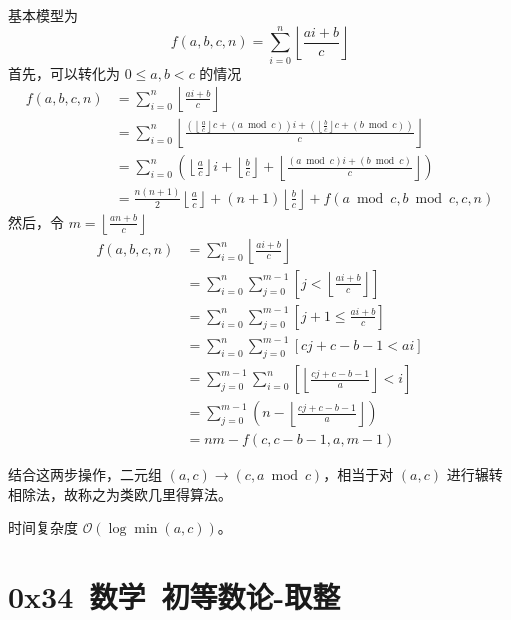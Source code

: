 基本模型为
\[
f(a, b, c, n) = \sum_{i = 0}^n \left\lfloor \frac{ai + b}{c} \right\rfloor
\]
首先，可以转化为 $0 \leq a, b < c$ 的情况
\[
\begin{aligned}
f(a, b, c, n) & = \sum_{i = 0}^n \left\lfloor \frac{ai + b}{c} \right\rfloor \\
& = \sum_{i = 0}^n \left\lfloor \frac{\left(\left\lfloor \frac{a}{c} \right\rfloor c + (a \bmod c) \right)i + \left(\left\lfloor \frac{b}{c} \right\rfloor c + (b \bmod c)\right)}{c} \right\rfloor \\
& = \sum_{i = 0}^n \left( \left\lfloor \frac{a}{c} \right\rfloor i + \left\lfloor \frac{b}{c} \right\rfloor + \left\lfloor \frac{(a \bmod c) i + (b \bmod c)}{c} \right\rfloor \right) \\
& = \frac{n(n + 1)}{2} \left\lfloor \frac{a}{c} \right\rfloor + (n + 1)\left\lfloor \frac{b}{c} \right\rfloor + f(a \bmod c, b \bmod c, c, n)
\end{aligned}
\]
然后，令 $m = \left\lfloor \frac{an + b}{c} \right\rfloor$
\[
\begin{aligned}
f(a, b, c, n) & = \sum_{i = 0}^n \left\lfloor \frac{ai + b}{c} \right\rfloor \\
& = \sum_{i = 0}^n \sum_{j = 0}^{m - 1} \left[ j < \left\lfloor \frac{ai + b}{c} \right\rfloor \right] \\
& = \sum_{i = 0}^n \sum_{j = 0}^{m - 1} \left[ j + 1 \leq \frac{ai + b}{c} \right] \\
& = \sum_{i = 0}^n \sum_{j = 0}^{m - 1} \left[ cj + c - b - 1 < ai \right] \\
& = \sum_{j = 0}^{m - 1} \sum_{i = 0}^n \left[ \left\lfloor \frac{cj + c - b - 1}{a} \right\rfloor < i \right] \\
& = \sum_{j = 0}^{m - 1} \left( n - \left\lfloor \frac{cj + c - b - 1}{a} \right\rfloor \right) \\
& = nm - f(c, c - b - 1, a, m - 1)
\end{aligned}
\]

结合这两步操作，二元组 $(a, c) \to (c, a \bmod c)$，相当于对 $(a, c)$ 进行辗转相除法，故称之为类欧几里得算法。

时间复杂度 $\mathcal{O}(\log \min(a, c))$。


\section{0x34\ 数学\ 初等数论-取整}
\label{sec:0x34c}


